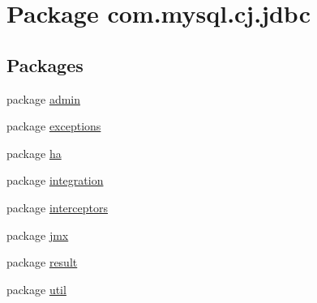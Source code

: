 \hypertarget{namespacecom_1_1mysql_1_1cj_1_1jdbc}{}\section{Package com.\+mysql.\+cj.\+jdbc}
\label{namespacecom_1_1mysql_1_1cj_1_1jdbc}
\subsection*{Packages}
\begin{DoxyCompactItemize}
\item 
package \mbox{\hyperlink{namespacecom_1_1mysql_1_1cj_1_1jdbc_1_1admin}{admin}}
\item 
package \mbox{\hyperlink{namespacecom_1_1mysql_1_1cj_1_1jdbc_1_1exceptions}{exceptions}}
\item 
package \mbox{\hyperlink{namespacecom_1_1mysql_1_1cj_1_1jdbc_1_1ha}{ha}}
\item 
package \mbox{\hyperlink{namespacecom_1_1mysql_1_1cj_1_1jdbc_1_1integration}{integration}}
\item 
package \mbox{\hyperlink{namespacecom_1_1mysql_1_1cj_1_1jdbc_1_1interceptors}{interceptors}}
\item 
package \mbox{\hyperlink{namespacecom_1_1mysql_1_1cj_1_1jdbc_1_1jmx}{jmx}}
\item 
package \mbox{\hyperlink{namespacecom_1_1mysql_1_1cj_1_1jdbc_1_1result}{result}}
\item 
package \mbox{\hyperlink{namespacecom_1_1mysql_1_1cj_1_1jdbc_1_1util}{util}}
\end{DoxyCompactItemize}
